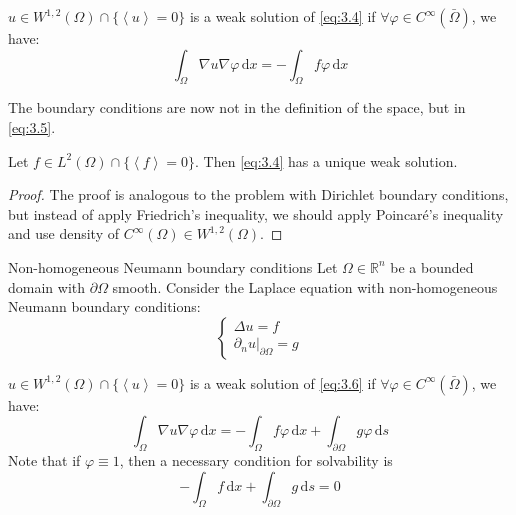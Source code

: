 \documentclass{report}
\begin{document}
\begin{definition}{}{}
    \(u \in W^{1, 2}(\Omega) \cap \{\left\langle u \right\rangle = 0\}\) is a weak solution of \ref{eq:3.4} if \(\forall \varphi \in C^{\infty}(\bar{\Omega})\), we have:
    \begin{equation}\label{eq:3.5}
        \int_{\Omega} \nabla u \nabla \varphi \,\mathrm{d}x = - \int_{\Omega} f \varphi \,\mathrm{d}x
    \end{equation}

\end{definition}

\begin{note}
    The boundary conditions are now not in the definition of the space, but in \ref{eq:3.5}.
\end{note}

\begin{theorem}{}{}
    Let \(f \in L^{2}(\Omega) \cap \{\left\langle f \right\rangle = 0\}\). Then \ref{eq:3.4} has a unique weak solution. 
\end{theorem}

\begin{proof}
    The proof is analogous to the problem with Dirichlet boundary conditions, but instead of apply Friedrich's inequality, we should apply Poincaré's inequality and use density of \(C^{\infty}(\Omega) \in W^{1, 2}(\Omega)\). 
\end{proof}

\begin{example}{Non-homogeneous Neumann boundary conditions}{}
    Let \(\Omega \in \mathbb{R}^{n}\) be a bounded domain with \(\partial \Omega\) smooth. Consider the Laplace equation with non-homogeneous Neumann boundary conditions:
    \begin{equation}\label{eq:3.6}
        \begin{cases}
            \Delta u = f \\
            \left. \partial_{n} u \right|_{\partial \Omega} = g
        \end{cases}
    \end{equation}
\end{example}

\begin{definition}{}{}
    \(u \in W^{1, 2}(\Omega) \cap \{\left\langle u \right\rangle = 0\}\) is a weak solution of \ref{eq:3.6} if \(\forall \varphi \in C^{\infty}(\bar{\Omega})\), we have:
    \begin{equation}\label{eq:3.7}
        \int_{\Omega} \nabla u \nabla \varphi \,\mathrm{d}x = - \int_{\Omega} f \varphi \,\mathrm{d}x + \int_{\partial\Omega} g\varphi \,\mathrm{d}s
    \end{equation}
    Note that if \(\varphi \equiv 1\), then a necessary condition for solvability is
    \[
        - \int_{\Omega} f \,\mathrm{d}x + \int_{\partial\Omega} g \,\mathrm{d}s = 0
    \]
\end{definition}
\end{document}

